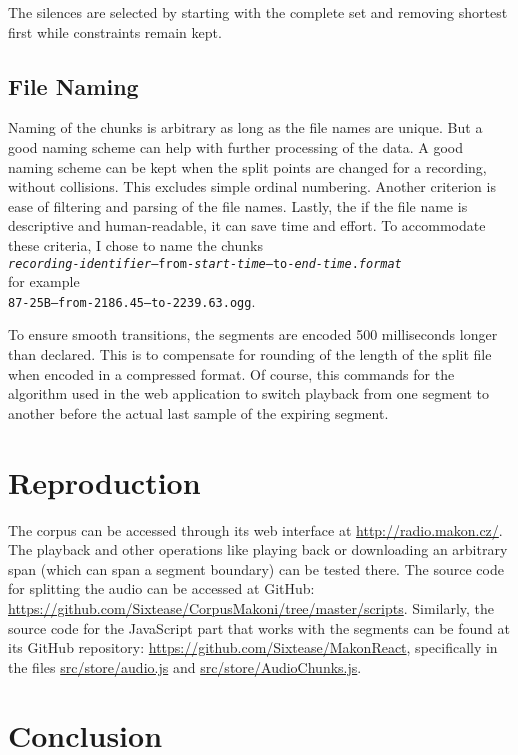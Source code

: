 \documentclass[conference]{IEEEtran}
\begin{document}
The silences are selected by starting with the complete set and removing
shortest first while constraints remain kept.

\subsection{File Naming}

Naming of the chunks is arbitrary as long as the file names are unique. But a
good naming scheme can help with further processing of the data. A good naming
scheme can be kept when the split points are changed for a recording, without
collisions. This excludes simple ordinal numbering. Another criterion is ease of
filtering and parsing of the file names. Lastly, the if the file name is
descriptive and human-readable, it can save time and effort. To accommodate
these criteria, I chose to name the chunks \\
\texttt{{\em{}recording-identifier}--from-{\em{}start-time}--to-{\em{}end-time}.{\em{}format}} \\
for example \\
\texttt{87-25B--from-2186.45--to-2239.63.ogg}.

To ensure smooth transitions, the segments are encoded 500 milliseconds longer
than declared. This is to compensate for rounding of the length of the split
file when encoded in a compressed format. Of course, this commands for the
algorithm used in the web application to switch playback from one segment to
another before the actual last sample of the expiring segment.

\section{Reproduction}

The corpus can be accessed through its web interface at
\url{http://radio.makon.cz/}. The playback and other operations like playing
back or downloading an arbitrary span (which can span a segment boundary) can be
tested there. The source code for splitting the audio can be accessed at
GitHub: \\
\url{https://github.com/Sixtease/CorpusMakoni/tree/master/scripts}.
Similarly, the source code for the JavaScript part that works with the segments
can be found at its GitHub repository:
\url{https://github.com/Sixtease/MakonReact}, specifically in the files
\url{src/store/audio.js} and \url{src/store/AudioChunks.js}.

\section{Conclusion}
\end{document}
